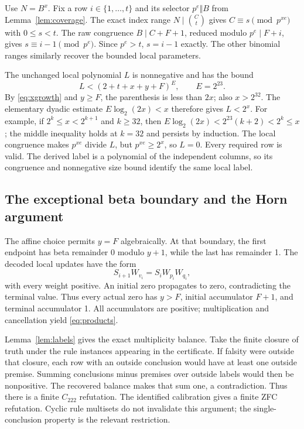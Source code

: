 \documentclass[11pt]{article}
\begin{document}
Use $N=B^x$. Fix a row $i\in\{1,\ldots,t\}$ and its selector
$p^e\Vert B$ from Lemma~\ref{lem:coverage}. The exact index range
$N\mid\binom Ct$ gives $C\equiv s\pmod{p^{xe}}$ with $0\le s<t$.
The raw congruence $B\mid C+F+1$, reduced modulo $p^e\mid F+i$,
gives $s\equiv i-1\pmod{p^e}$. Since $p^e>t$, $s=i-1$ exactly.
The other binomial ranges similarly recover the bounded local parameters.

The unchanged local polynomial $L$ is nonnegative and has the bound
\[
 L<(2+t+x+y+F)^E,\qquad E=2^{23}.
\]
By \eqref{eq:xgrowth} and $y\ge F$, the parenthesis is less than $2x$;
also $x>2^{32}$. The elementary dyadic estimate
$E\log_2(2x)<x$ therefore gives $L<2^x$. For example, if
$2^k\le x<2^{k+1}$ and $k\ge32$, then
$E\log_2(2x)<2^{23}(k+2)<2^k\le x$; the middle inequality holds at
$k=32$ and persists by induction. The local congruence makes $p^{xe}$
divide $L$, but $p^{xe}\ge2^x$, so $L=0$. Every required row is valid.
The derived label is a polynomial of the independent columns, so its
congruence and nonnegative size bound identify the same local label.

\subsection{The exceptional beta boundary and the Horn argument}

The affine choice permits $y=F$ algebraically. At that boundary, the
first endpoint has beta remainder 0 modulo $y+1$, while the last has
remainder 1. The decoded local updates have the form
\[
 S_{i+1}W_{v_i}=S_iW_{p_i}W_{q_i},
\]
with every weight positive. An initial zero propagates to zero, contradicting
the terminal value. Thus every actual zero has $y>F$, initial accumulator
$F+1$, and terminal accumulator 1. All accumulators are positive;
multiplication and cancellation yield \eqref{eq:products}.

Lemma~\ref{lem:labels} gives the exact multiplicity balance. Take the
finite closure of truth under the rule instances appearing in the certificate.
If falsity were outside that closure, each row with an outside conclusion
would have at least one outside premise. Summing conclusions minus premises
over outside labels would then be nonpositive. The recovered balance makes
that sum one, a contradiction. Thus there is a finite $C_{222}$ refutation.
The identified calibration gives a finite ZFC refutation. Cyclic rule
multisets do not invalidate this argument; the single-conclusion property
is the relevant restriction.
\end{document}
